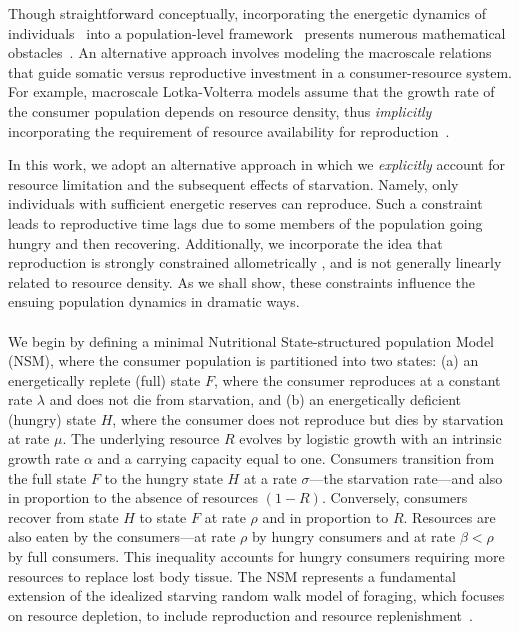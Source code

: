 \documentclass{pnastwo}
\begin{document}
\begin{article}
Though straightforward conceptually, incorporating the energetic dynamics of individuals~\cite{Kooi2000} into a population-level framework~\cite{Kooi2000,Sousa:2010ez} presents numerous mathematical obstacles~\cite{Diekmann:2010da}.
An alternative approach involves modeling the macroscale relations that guide somatic versus reproductive investment in a consumer-resource system.
For example, macroscale Lotka-Volterra models assume that the growth rate of the consumer population depends on resource density, thus \emph{implicitly} incorporating the requirement of resource availability for reproduction~\cite{murdoch:2003}.

In this work, we adopt an alternative approach in which we \emph{explicitly} account for resource limitation and the subsequent effects of starvation.
Namely, only individuals with sufficient energetic reserves can reproduce.
Such a constraint leads to reproductive time lags due to some members of the population going hungry and then recovering.
Additionally, we incorporate the idea that reproduction is strongly constrained allometrically \cite{Kempes:2012hy}, and is not generally linearly related to resource density.
As we shall show, these constraints influence the ensuing population dynamics in dramatic ways.
\\

\\
We begin by defining a minimal Nutritional State-structured population Model (NSM), where the consumer population is partitioned into two states: (a) an energetically replete (full) state $F$, where the consumer reproduces at a constant rate $\lambda$ and does not die from starvation, and (b) an energetically deficient (hungry) state $H$, where the consumer does not reproduce but dies by starvation at rate $\mu$.
The underlying resource $R$ evolves by logistic growth with an intrinsic growth rate $\alpha$ and a carrying capacity equal to one.
Consumers transition from the full state $F$ to the hungry state $H$ at a rate $\sigma$---the starvation rate---and also in proportion to the absence of resources $(1-R)$.  Conversely, consumers recover from state $H$ to state $F$ at rate $\rho$ and in proportion to $R$.
Resources are also eaten by the consumers---at rate $\rho$ by hungry consumers and at rate $\beta<\rho$ by full consumers.
This inequality accounts for hungry consumers requiring more resources to replace lost body tissue.
The NSM represents a fundamental extension of the idealized starving random walk model of foraging, which focuses on resource depletion, to include reproduction and resource replenishment~\cite{Benichou:2014wu,Benichou:2016wl,Chupeau:2016jf}.


\end{article}
\end{document}
